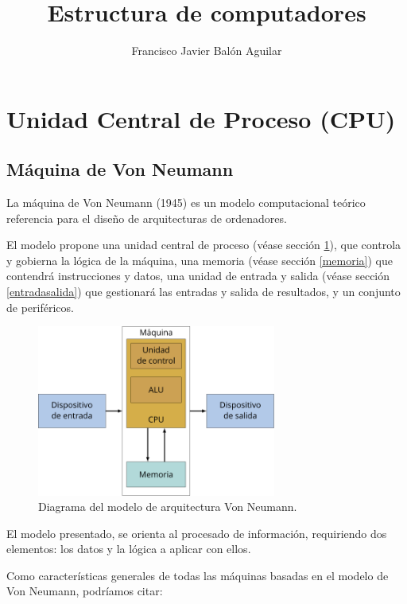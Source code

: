 \documentclass[a4paper, 11pt, titlepage]{article}
\title{Estructura de computadores}
\author{Francisco Javier Balón Aguilar}
\begin{document}
\maketitle
\renewcommand{\contentsname}{Índice}
\tableofcontents
\newpage

\section{Unidad Central de Proceso (CPU)}\label{cpu}

    \subsection{Máquina de Von Neumann}

        La máquina de Von Neumann (1945) es un modelo computacional teórico referencia para 
        el diseño de arquitecturas de ordenadores.

        El modelo propone una unidad central de proceso (véase sección \ref{cpu}), que controla y gobierna la lógica 
        de la máquina, una memoria (véase sección \ref{memoria}) que contendrá instrucciones y datos, una unidad de entrada
        y salida (véase sección \ref{entradasalida}) que gestionará las entradas y salida de resultados, y un conjunto de periféricos.

        \begin{figure}[htp]
            \centering
            \includegraphics[width=0.7\textwidth]{resources/vonneumann.png}
            \caption{Diagrama del modelo de arquitectura Von Neumann.}
            \label{vonneumann}
        \end{figure}

        El modelo presentado, se orienta al
        procesado de información, requiriendo dos elementos: los datos y la lógica a aplicar 
        con ellos.

        Como características generales de todas las máquinas basadas en el modelo de Von Neumann, 
        podríamos citar:
\end{document}
